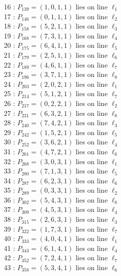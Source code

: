 \documentclass{article}
\begin{document}
{\begin{multicols}{2}
16 : $P_{139}=( 1, 0, 1, 1 )$ lies on line $\ell_{1}$\\
17 : $P_{146}=( 0, 1, 1, 1 )$ lies on line $\ell_{2}$\\
18 : $P_{158}=( 5, 2, 1, 1 )$ lies on line $\ell_{3}$\\
19 : $P_{168}=( 7, 3, 1, 1 )$ lies on line $\ell_{4}$\\
20 : $P_{175}=( 6, 4, 1, 1 )$ lies on line $\ell_{5}$\\
21 : $P_{179}=( 2, 5, 1, 1 )$ lies on line $\ell_{6}$\\
22 : $P_{189}=( 4, 6, 1, 1 )$ lies on line $\ell_{7}$\\
23 : $P_{196}=( 3, 7, 1, 1 )$ lies on line $\ell_{8}$\\
24 : $P_{203}=( 2, 0, 2, 1 )$ lies on line $\ell_{1}$\\
25 : $P_{214}=( 5, 1, 2, 1 )$ lies on line $\ell_{7}$\\
26 : $P_{217}=( 0, 2, 2, 1 )$ lies on line $\ell_{2}$\\
27 : $P_{231}=( 6, 3, 2, 1 )$ lies on line $\ell_{8}$\\
28 : $P_{240}=( 7, 4, 2, 1 )$ lies on line $\ell_{3}$\\
29 : $P_{242}=( 1, 5, 2, 1 )$ lies on line $\ell_{5}$\\
30 : $P_{252}=( 3, 6, 2, 1 )$ lies on line $\ell_{4}$\\
31 : $P_{261}=( 4, 7, 2, 1 )$ lies on line $\ell_{6}$\\
32 : $P_{268}=( 3, 0, 3, 1 )$ lies on line $\ell_{1}$\\
33 : $P_{280}=( 7, 1, 3, 1 )$ lies on line $\ell_{5}$\\
34 : $P_{287}=( 6, 2, 3, 1 )$ lies on line $\ell_{6}$\\
35 : $P_{289}=( 0, 3, 3, 1 )$ lies on line $\ell_{2}$\\
36 : $P_{302}=( 5, 4, 3, 1 )$ lies on line $\ell_{8}$\\
37 : $P_{309}=( 4, 5, 3, 1 )$ lies on line $\ell_{4}$\\
38 : $P_{315}=( 2, 6, 3, 1 )$ lies on line $\ell_{3}$\\
39 : $P_{322}=( 1, 7, 3, 1 )$ lies on line $\ell_{7}$\\
40 : $P_{333}=( 4, 0, 4, 1 )$ lies on line $\ell_{1}$\\
41 : $P_{343}=( 6, 1, 4, 1 )$ lies on line $\ell_{4}$\\
42 : $P_{352}=( 7, 2, 4, 1 )$ lies on line $\ell_{7}$\\
43 : $P_{358}=( 5, 3, 4, 1 )$ lies on line $\ell_{6}$\\

\end{multicols}}
\end{document}
